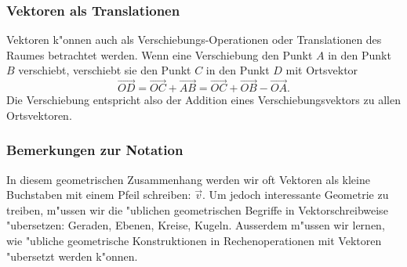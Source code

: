\subsubsection{Vektoren als Translationen}
Vektoren k"onnen auch als Verschiebungs-Operationen  oder Translationen
des Raumes betrachtet werden.
Wenn eine Verschiebung den Punkt $A$ in den Punkt $B$ verschiebt,
verschiebt sie den Punkt $C$ in den Punkt $D$ mit Ortsvektor
\[
\overrightarrow{OD}
=
\overrightarrow{OC}+\overrightarrow{AB}
=
\overrightarrow{OC}+\overrightarrow{OB}-\overrightarrow{OA}.
\]
Die Verschiebung entspricht also der Addition eines Verschiebungsvektors
zu allen Ortsvektoren.

\subsubsection{Bemerkungen zur Notation}
In diesem geometrischen Zusammenhang werden wir oft Vektoren als
kleine Buchstaben mit einem Pfeil schreiben: $\vec v$.
Um jedoch interessante
Geometrie zu treiben, m"ussen wir die "ublichen geometrischen Begriffe in
Vektorschreibweise "ubersetzen: Geraden, Ebenen, Kreise, Kugeln.
Ausserdem m"ussen wir lernen, wie "ubliche geometrische Konstruktionen in
Rechenoperationen mit Vektoren "ubersetzt werden k"onnen.


